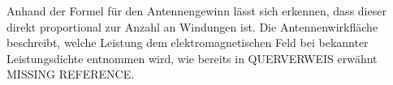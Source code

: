 Anhand der Formel für den Antennengewinn lässt sich erkennen, dass dieser direkt proportional zur Anzahl an Windungen ist. Die Antennenwirkfläche beschreibt, welche Leistung dem elektromagnetischen Feld bei bekannter Leistungsdichte entnommen wird, wie bereits in QUERVERWEIS erwähnt MISSING REFERENCE.

